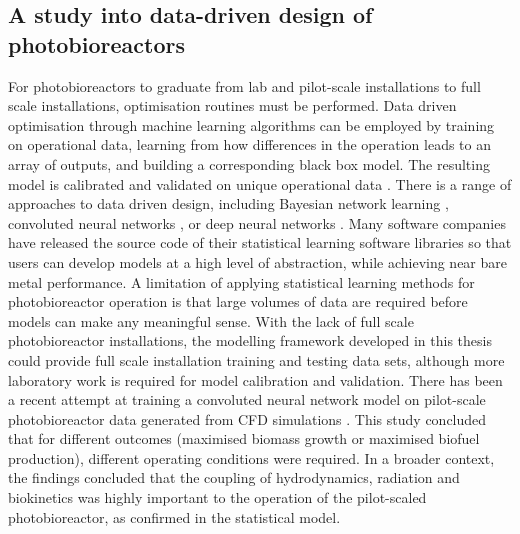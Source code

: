 \subsection{A study into data-driven design of photobioreactors}
For photobioreactors to graduate from lab and pilot-scale installations to full scale installations, optimisation routines must be performed. Data driven optimisation through machine learning algorithms can be employed by training on operational data, learning from how differences in the operation leads to an array of outputs, and building a corresponding black box model. The resulting model is calibrated and validated on unique operational data \cite{pedregosa2011}. There is a range of approaches to data driven design, including Bayesian network learning \cite{hu2018}, convoluted neural networks \cite{rio-chanona2019}, or deep neural networks \cite{deepa2018}. Many software companies have released the source code of their statistical learning software libraries so that users can develop models at a high level of abstraction, while achieving near bare metal performance.
\skippingparagraph
A limitation of applying statistical learning methods for photobioreactor operation is that large volumes of data are required before models can make any meaningful sense. With the lack of full scale photobioreactor installations, the modelling framework developed in this thesis could provide full scale installation training and testing data sets, although more laboratory work is required for model calibration and validation. There has been a recent attempt at training a convoluted neural network model on pilot-scale photobioreactor data generated from CFD simulations \cite{rio-chanona2019}. This study concluded that for different outcomes (maximised biomass growth or maximised biofuel production), different operating conditions were required. In a broader context, the findings concluded that the coupling of hydrodynamics, radiation and biokinetics was highly important to the operation of the pilot-scaled photobioreactor, as confirmed in the statistical model. 

